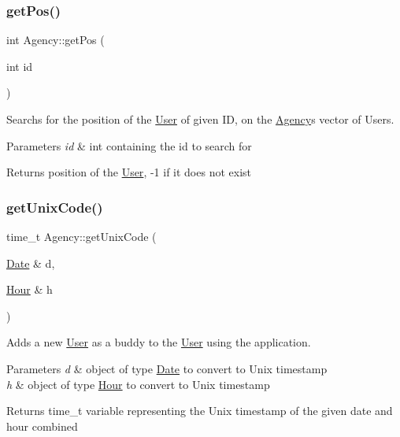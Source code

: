 \subsubsection{\texorpdfstring{get\+Pos()}{getPos()}}
{\footnotesize\ttfamily int Agency\+::get\+Pos (\begin{DoxyParamCaption}\item[{int}]{id }\end{DoxyParamCaption})}



Searchs for the position of the \hyperlink{class_user}{User} of given ID, on the \hyperlink{class_agency}{Agency}\textquotesingle{}s vector of Users. 


\begin{DoxyParams}{Parameters}
{\em id} & int containing the id to search for\\
\hline
\end{DoxyParams}
\begin{DoxyReturn}{Returns}
position of the \hyperlink{class_user}{User}, -\/1 if it does not exist 
\end{DoxyReturn}
\mbox{\label{group___agency_ga00fdbd79de096b13dd0033478552164a}} 
\subsubsection{\texorpdfstring{get\+Unix\+Code()}{getUnixCode()}}
{\footnotesize\ttfamily time\+\_\+t Agency\+::get\+Unix\+Code (\begin{DoxyParamCaption}\item[{\hyperlink{class_date}{Date} \&}]{d,  }\item[{\hyperlink{class_hour}{Hour} \&}]{h }\end{DoxyParamCaption})}



Adds a new \hyperlink{class_user}{User} as a buddy to the \hyperlink{class_user}{User} using the application. 


\begin{DoxyParams}{Parameters}
{\em d} & object of type \hyperlink{class_date}{Date} to convert to Unix timestamp \\
\hline
{\em h} & object of type \hyperlink{class_hour}{Hour} to convert to Unix timestamp\\
\hline
\end{DoxyParams}
\begin{DoxyReturn}{Returns}
time\+\_\+t variable representing the Unix timestamp of the given date and hour combined 
\end{DoxyReturn}
\mbox{\label{group___agency_gaf7b06f6c289c6c6a7acf09dda8a6f7d5}} 
